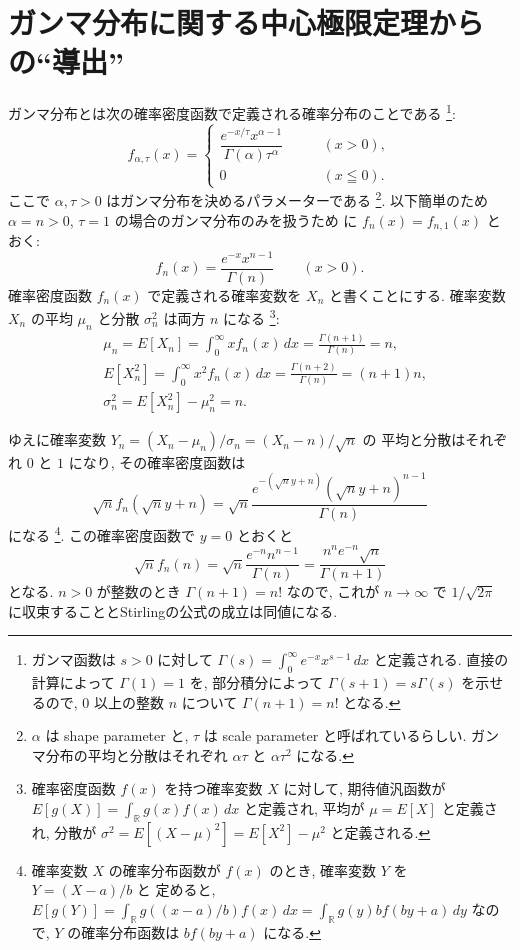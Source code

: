 \documentclass[12pt,twoside]{jarticle}
\newcommand\R{{\mathbb R}} %
\theoremstyle{jplain}
\theoremstyle{jplain}
\theoremstyle{jplain}
\numberwithin{theorem}{section}
\numberwithin{equation}{section}
\numberwithin{figure}{section}
\numberwithin{table}{section}
\begin{document}

\section{ガンマ分布に関する中心極限定理からの``導出''}

ガンマ分布とは次の確率密度函数で定義される確率分布のことである%
\footnote{ガンマ函数は $s>0$ に対して
$\Gamma(s)=\int_0^\infty e^{-x}x^{s-1}\,dx$ と定義される.
直接の計算によって $\Gamma(1)=1$ を,
部分積分によって $\Gamma(s+1)=s\Gamma(s)$ を示せるので,
$0$ 以上の整数 $n$ について $\Gamma(n+1)=n!$ となる.}:
\[
f_{\alpha,\tau}(x) =
\begin{cases}
\dfrac{e^{-x/\tau}x^{\alpha-1}}{\Gamma(\alpha)\tau^\alpha} & \qquad (x>0), \\
0 & \qquad (x\leqq 0).
\end{cases}
\]
ここで $\alpha,\tau>0$ はガンマ分布を決めるパラメーターである%
\footnote{$\alpha$ は shape parameter と,
$\tau$ は scale parameter と呼ばれているらしい.
ガンマ分布の平均と分散はそれぞれ $\alpha\tau$ と $\alpha\tau^2$ になる.}.
以下簡単のため $\alpha=n>0$, $\tau=1$ の場合のガンマ分布のみを扱うため
に $f_n(x)=f_{n,1}(x)$ とおく:
\[
f_n(x) = \frac{e^{-x} x^{n-1}}{\Gamma(n)} \qquad (x>0).
\]
確率密度函数 $f_n(x)$ で定義される確率変数を $X_n$ と書くことにする.
確率変数 $X_n$ の平均 $\mu_n$ と分散 $\sigma_n^2$ は両方 $n$ になる%
\footnote{確率密度函数 $f(x)$ を持つ確率変数 $X$ に対して,
期待値汎函数が $E[g(X)]=\int_\R g(x)f(x)\,dx$ と定義され,
平均が $\mu=E[X]$ と定義され,
分散が $\sigma^2=E[(X-\mu)^2]=E[X^2]-\mu^2$ と定義される.}:
\begin{align*}
&
\mu_n = E[X_n] = \int_0^\infty x f_n(x)\,dx = \frac{\Gamma(n+1)}{\Gamma(n)}=n,
\\ &
E[X_n^2] = \int_0^\infty x^2 f_n(x)\,dx = \frac{\Gamma(n+2)}{\Gamma(n)}=(n+1)n,
\\ &
\sigma_n^2 = E[X_n^2]-\mu_n^2 = n.
\end{align*}

ゆえに確率変数 $Y_n=(X_n-\mu_n)/\sigma_n=(X_n-n)/\sqrt{n}$ の
平均と分散はそれぞれ $0$ と $1$ になり, その確率密度函数は
\[
\sqrt{n}f_n(\sqrt{n}y+n)
=
\sqrt{n}\frac{e^{-(\sqrt{n}y+n)}(\sqrt{n}y+n)^{n-1}}{\Gamma(n)}
\]
になる%
\footnote{確率変数 $X$ の確率分布函数が $f(x)$ のとき, 確率変数 $Y$ を $Y=(X-a)/b$ と
定めると, $E[g(Y)]=\int_\R g((x-a)/b)f(x)\,dx = \int_\R g(y) b f(by+a)\,dy$ なので,
$Y$ の確率分布函数は $b f(by+a)$ になる.}.
この確率密度函数で $y=0$ とおくと
\[
\sqrt{n}f_n(n)
=
\sqrt{n}\frac{e^{-n}n^{n-1}}{\Gamma(n)}
=
\frac{n^n e^{-n}\sqrt{n}}{\Gamma(n+1)}
\]
となる. $n>0$ が整数のとき $\Gamma(n+1)=n!$ なので,
これが $n\to\infty$ で $1/\sqrt{2\pi}$ に収束することとStirlingの公式の成立は同値になる.
\end{document}
